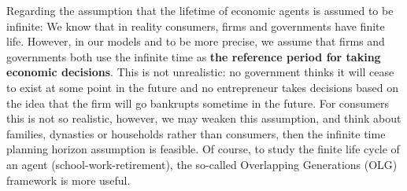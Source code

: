 \begin{enumerate}
\begin{solution}
              Regarding the assumption that the lifetime of economic agents is assumed to be infinite: We know that in reality consumers, firms and governments have finite life. However, in our models and to be more precise, we assume that firms and governments both use the infinite time as \textbf{the reference period for taking economic decisions}. This is not unrealistic: no government thinks it will cease to exist at some point in the future and no entrepreneur takes decisions based on the idea that the firm will go bankrupts sometime in the future. For consumers this is not so realistic, however, we may weaken this assumption, and think about families, dynasties or households rather than consumers, then the infinite time planning horizon assumption is feasible. Of course, to study the finite life cycle of an agent (school-work-retirement), the so-called Overlapping Generations (OLG) framework is more useful.
          \end{solution}
\end{enumerate}
\newpage

